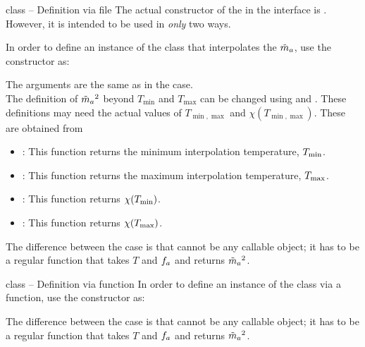 \documentclass[10pt,utf8,compress,xcolor=dvipsnames]{beamer}
\begin{document}
\begin{frame}{ class -- Definition via file}
	\fontB
	The actual constructor of the  in the \PY interface is . However, it is intended to be used in {\em only} two ways. 
	
	In order to define an instance of the  class that interpolates the $\tilde m_{a}{}$, use the constructor as:
	\lstset{language = python}
	
	The arguments are the same as in the \CPP case. \\[0.5cm]
	
	The definition of $\tilde m_{a}{}^2$ beyond $T_{\min}$ and $T_{\max}$ can be changed using   and . These definitions may need the actual values of   $T_{\min,\max}$ and $\chi(T_{\min,\max})$. These are obtained from
	\begin{itemize}
		\item {}: This function returns the minimum interpolation temperature, $T_{\rm min}$. 
		\item {}: This function returns the maximum interpolation temperature, $T_{\rm max}$.
		\item {}: This function returns $\chi(T_{\rm min})$.
		\item {}: This function returns $\chi(T_{\rm max})$.
	\end{itemize}
	
	The difference between the \CPP case is that  cannot be any callable object; it has to be a regular function that takes $T$ and $f_{a}{}$ and returns $\tilde m_{a}{}^2$.
\end{frame}

\begin{frame}{ class -- Definition via function}
	\fontB
	In order to define an instance of the  class via a function, use the constructor as:
	\lstset{language = python}
	
	
	The difference between the \CPP case is that  cannot be any callable object; it has to be a regular function that takes $T$ and $f_{a}{}$ and returns $\tilde m_{a}{}^2$.
\end{frame}
\end{document}
